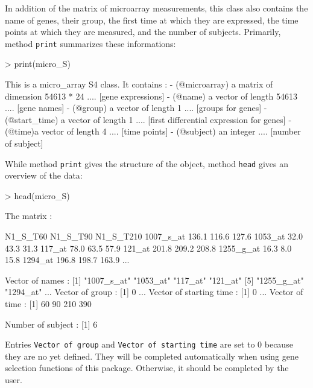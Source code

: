 \documentclass[a4paper]{article}
\begin{document}
In addition of the matrix of microarray measurements, this class also contains the name of genes, their group, the first time at which they are expressed, the time points at which they are measured, and the number of subjects. Primarily, method \texttt{print} summarizes these informations:

\begin{Schunk}
\begin{Sinput}
> print(micro_S)
\end{Sinput}
\begin{Soutput}
This is a micro_array S4 class. It contains : 
 - (@microarray) a matrix of dimension  54613 * 24 
          .... [gene expressions] 
 - (@name) a vector of length  54613  .... [gene names] 
 - (@group) a vector of length  1  .... [groups for genes] 
 - (@start_time) a vector of length  1 
          .... [first differential expression for genes] 
 - (@time)a vector of length  4  .... [time points]
 - (@subject) an integer  .... [number of subject]
\end{Soutput}
\end{Schunk}

While method \texttt{print} gives the structure of the object, method \texttt{head} gives an overview of the data:

\begin{Schunk}
\begin{Sinput}
> head(micro_S)
\end{Sinput}
\begin{Soutput}
The matrix :

          N1_S_T60 N1_S_T90 N1_S_T210
1007_s_at    136.1    116.6     127.6
1053_at       32.0     43.3      31.3
117_at        78.0     63.5      57.9
121_at       201.8    209.2     208.8
1255_g_at     16.3      8.0      15.8
1294_at      196.8    198.7     163.9
...

Vector of names :
[1] "1007_s_at" "1053_at"   "117_at"    "121_at"   
[5] "1255_g_at" "1294_at"  
...
Vector of group :
[1] 0
...
Vector of starting time :
[1] 0
...
Vector of time :
[1]  60  90 210 390

Number of subject :
[1] 6
\end{Soutput}
\end{Schunk}

Entries \texttt{Vector of group} and \texttt{Vector of starting time} are set to $0$ because they are no yet defined. They will be completed automatically when using gene selection functions of this package. Otherwise, it should be completed by the user. \\
\end{document}
